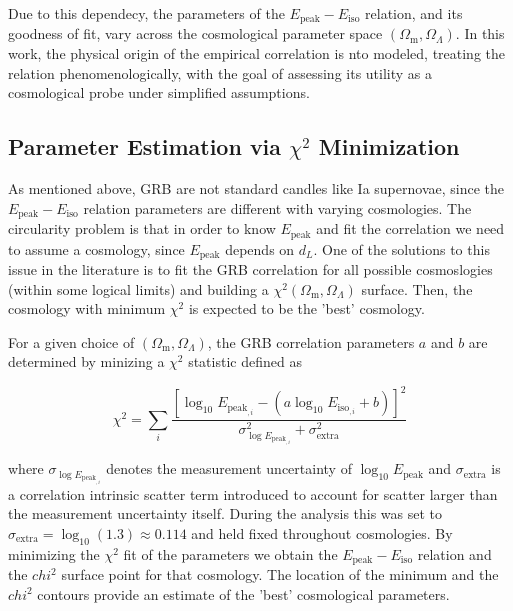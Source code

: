 \documentclass[
    aps,
    prd,
    twocolumn,
    nofootinbib,
    floatfix,
    superscriptaddress
]{revtex4-2}
\newcommand{\Om}{\Omega_{\mathrm{m}}}
\newcommand{\Ol}{\Omega_\Lambda}
\newcommand{\Ep}{E_\mathrm{peak}}
\newcommand{\Ei}{E_\mathrm{iso}}
\begin{document}
Due to this dependecy, the parameters of the $\Ep-\Ei$ relation, and its goodness of fit, vary across the cosmological parameter space $(\Om, \Omega_\Lambda)$. In this work, the physical origin of the empirical correlation is nto modeled, treating the relation phenomenologically, with the goal of assessing its utility as a cosmological probe under simplified assumptions.

\subsection{Parameter Estimation via $\chi^2$ Minimization}

As mentioned above, GRB are not standard candles like Ia supernovae, since the $\Ep-\Ei$ relation parameters are different with varying cosmologies. The circularity problem is that in order to know $\Ep$ and fit the correlation we need to assume a cosmology, since $\Ep$ depends on $d_L$. One of the solutions to this issue in the literature is to fit the GRB correlation for all possible cosmoslogies (within some logical limits) and building a $\chi^2(\Om, \Ol)$ surface. Then, the cosmology with minimum $\chi^2$ is expected to be the 'best' cosmology.

For a given choice of $(\Om, \Ol)$, the GRB correlation parameters $a$ and $b$ are determined by minizing a $\chi^2$ statistic defined as

\begin{equation}
    \chi^2 = \sum_i \frac{\left[\log_{10}\Ep_{,i}-(a\log_{10}\Ei_{,i}+b)\right]^2}{\sigma_{\log \Ep_{,i}} ^2 + \sigma_\mathrm{extra} ^2}
\end{equation}

where $\sigma_{\log \Ep_{,i}}$ denotes the measurement uncertainty of $\log_{10} \Ep$ and $\sigma_\mathrm{extra}$ is a correlation intrinsic scatter term introduced to account for scatter larger than the measurement uncertainty itself. During the analysis this was set to $\sigma_\mathrm{extra} = \log_{10} (1.3) \approx 0.114$ and held fixed throughout cosmologies. By minimizing the $\chi^2$ fit of the parameters we obtain the $\Ep-\Ei$ relation and the $chi^2$ surface point for that cosmology. The location of the minimum and the $chi^2$ contours provide an estimate of the 'best' cosmological parameters.

\end{document}

